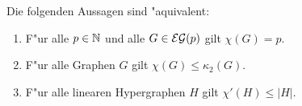 %
\begin{theorem}
  Die folgenden Aussagen sind "aquivalent:
  \begin{enumerate}[label={\rm(\alph*)}]
    \item F"ur alle $p\in{\mathbb{N}}$ und alle $G\in{\cal EG}(p)$ gilt $\chi(G) = p$.
    \item F"ur alle Graphen $G$ gilt $\chi(G) \leq \kappa_{2}(G)$.
    \item F"ur alle linearen Hypergraphen $H$ gilt $\chi'(H) \leq |H|$.
  \end{enumerate}
  \label{thm:equivefl}
\end{theorem}


